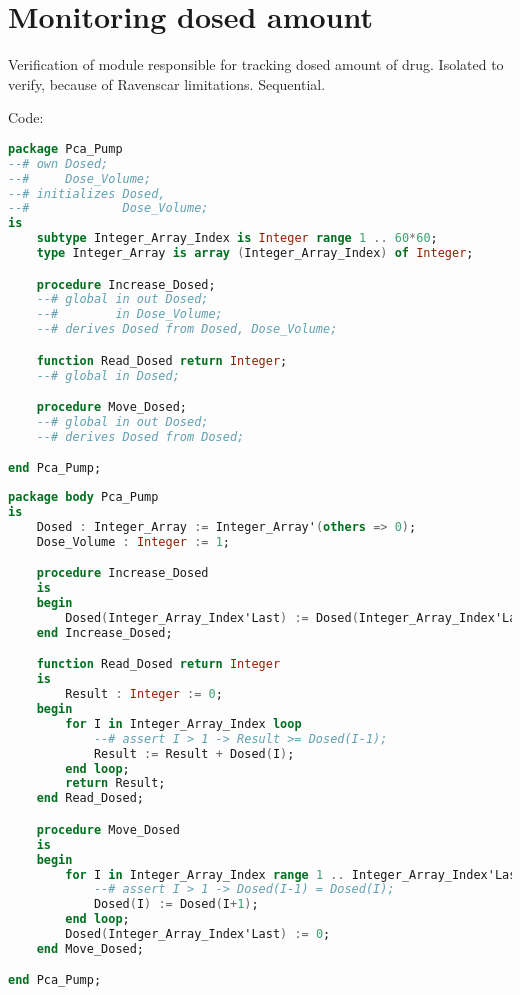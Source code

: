\section{Monitoring dosed amount}
\label{verification:pcapump:monitoring}

Verification of module responsible for tracking dosed amount of drug.
Isolated to verify, because of Ravenscar limitations.
Sequential.

Code:

\begin{lstlisting}[language=ada, frame=single, gobble=0, caption={Dose monitor module specification}, label={listing:pcapump_dosemonitor_spec}]
package Pca_Pump
--# own Dosed;
--#     Dose_Volume;
--# initializes Dosed,
--#             Dose_Volume;
is
    subtype Integer_Array_Index is Integer range 1 .. 60*60;
    type Integer_Array is array (Integer_Array_Index) of Integer;

    procedure Increase_Dosed;
    --# global in out Dosed;
    --#        in Dose_Volume;
    --# derives Dosed from Dosed, Dose_Volume;

    function Read_Dosed return Integer;
    --# global in Dosed;

    procedure Move_Dosed;
    --# global in out Dosed;
    --# derives Dosed from Dosed;

end Pca_Pump;
\end{lstlisting}


\begin{lstlisting}[language=ada, frame=single, gobble=0, caption={Dose monitor module body}, label={listing:pcapump_dosemonitor_body}]
package body Pca_Pump
is
    Dosed : Integer_Array := Integer_Array'(others => 0);
    Dose_Volume : Integer := 1;

    procedure Increase_Dosed
    is
    begin
        Dosed(Integer_Array_Index'Last) := Dosed(Integer_Array_Index'Last) + Dose_Volume;
    end Increase_Dosed;

    function Read_Dosed return Integer
    is
        Result : Integer := 0;
    begin
        for I in Integer_Array_Index loop
            --# assert I > 1 -> Result >= Dosed(I-1);
            Result := Result + Dosed(I);
        end loop;
        return Result;
    end Read_Dosed;

    procedure Move_Dosed
    is
    begin
        for I in Integer_Array_Index range 1 .. Integer_Array_Index'Last-1 loop
            --# assert I > 1 -> Dosed(I-1) = Dosed(I);
            Dosed(I) := Dosed(I+1);
        end loop;
        Dosed(Integer_Array_Index'Last) := 0;
    end Move_Dosed;

end Pca_Pump;

\end{lstlisting}


